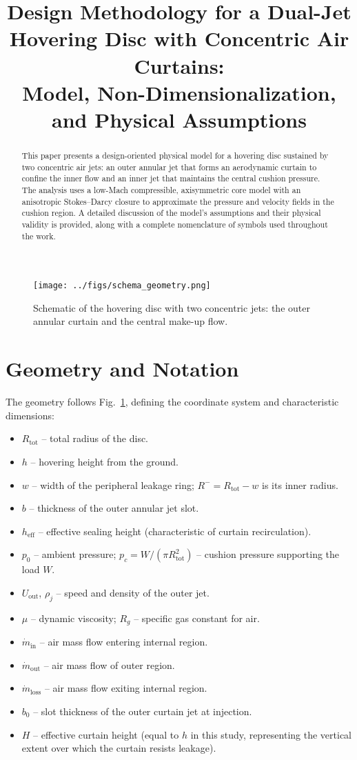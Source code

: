 \documentclass[11pt,a4paper]{article}
\title{Design Methodology for a Dual-Jet Hovering Disc with Concentric Air Curtains:\\
Model, Non-Dimensionalization, and Physical Assumptions}
\author{ }
\date{ }
\begin{document}
\maketitle

\begin{abstract}
This paper presents a design-oriented physical model for a hovering disc sustained by two concentric air jets:
an outer annular jet that forms an aerodynamic curtain to confine the inner flow and an inner jet that maintains the central cushion pressure.
The analysis uses a low-Mach compressible, axisymmetric core model with an anisotropic Stokes--Darcy closure to approximate the pressure and velocity fields in the cushion region.
A detailed discussion of the model's assumptions and their physical validity is provided, along with a complete nomenclature of symbols used throughout the work.
\end{abstract}

\begin{figure}[t]
  \centering
  \texttt{[image: ../figs/schema\_geometry.png]}
  \caption{Schematic of the hovering disc with two concentric jets: the outer annular curtain and the central make-up flow.}
  \label{fig:geometry}
\end{figure}

\section{Geometry and Notation}
\label{sec:geometry}
The geometry follows Fig.~\ref{fig:geometry}, defining the coordinate system and characteristic dimensions:
\begin{itemize}
  \item $R_{\mathrm{tot}}$ -- total radius of the disc.
  \item $h$ -- hovering height from the ground.
  \item $w$ -- width of the peripheral leakage ring; $R^{-}=R_{\mathrm{tot}}-w$ is its inner radius.
  \item $b$ -- thickness of the outer annular jet slot.
  \item $h_{\mathrm{eff}}$ -- effective sealing height (characteristic of curtain recirculation).
  \item $p_0$ -- ambient pressure; $p_c=W/(\pi R_{\mathrm{tot}}^2)$ -- cushion pressure supporting the load $W$.
  \item $U_{\mathrm{out}}$, $\rho_j$ -- speed and density of the outer jet.
  \item $\mu$ -- dynamic viscosity; $R_g$ -- specific gas constant for air.
  \item $\dot{m}_{\mathrm{in}}$ -- air mass flow entering internal region.
  \item $\dot{m}_{\mathrm{out}}$ -- air mass flow of outer region.
  \item $\dot{m}_{\mathrm{loss}}$ -- air mass flow exiting internal region.
  \item $b_0$ -- slot thickness of the outer curtain jet at injection.
  \item $H$ -- effective curtain height (equal to $h$ in this study, representing the vertical extent over which the curtain resists leakage).
\end{itemize}
\end{document}
